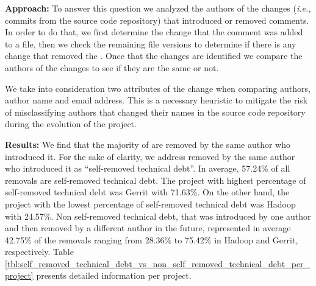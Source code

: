 \vspace{1mm}
\noindent \textbf{Approach:} To answer this question we analyzed the authors of the changes (\textit{i.e.,} commits from the source code repository) that introduced or removed \SATD comments. In order to do that, we first determine the change that the \SATD comment was added to a file, then we check the remaining file versions to determine if there is any change that removed the \SATD. Once that the changes are identified we compare the authors of the changes to see if they are the same or not. 

We take into consideration two attributes of the change when comparing authors, author name and email address. This is a necessary heuristic to mitigate the risk of misclassifying authors that changed their names in the source code repository during the evolution of the project.  

\vspace{1mm}
\noindent \textbf{Results:} We find that the majority of \SATD are removed by the same author who introduced it. For the sake of clarity, we address \SATD removed by the same author who introduced it as ``self-removed technical debt''. In average, 57.24\% of all removals are self-removed technical debt. The project with highest percentage of self-removed technical debt was Gerrit with 71.63\%. On the other hand, the project with the lowest percentage of self-removed technical debt was Hadoop with 24.57\%.  Non self-removed technical debt, \SATD that was introduced by one author and then removed by a different author in the future, represented in average 42.75\% of the removals ranging from 28.36\% to 75.42\% in Hadoop and Gerrit, respectively. Table \ref{tbl:self_removed_technical_debt_vs_non_self_removed_technical_debt_per_project} presents detailed information per project.


